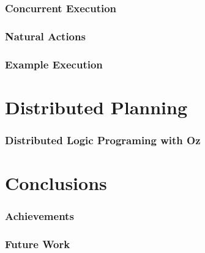 \documentclass[compress]{beamer}
\begin{document}
\begin{frame}
\frametitle{Concurrent Execution}
\end{frame}

\begin{frame}
\frametitle{Natural Actions}
\end{frame}

\begin{frame}
\frametitle{Example Execution}
\end{frame}

\section{Distributed Planning}

\begin{frame}
\frametitle{Distributed Logic Programing with Oz}
\end{frame}

\section{Conclusions}

\begin{frame}
\frametitle{Achievements}
\end{frame}

\begin{frame}
\frametitle{Future Work}
\end{frame}

\begin{frame}
\end{frame}
\end{document}
